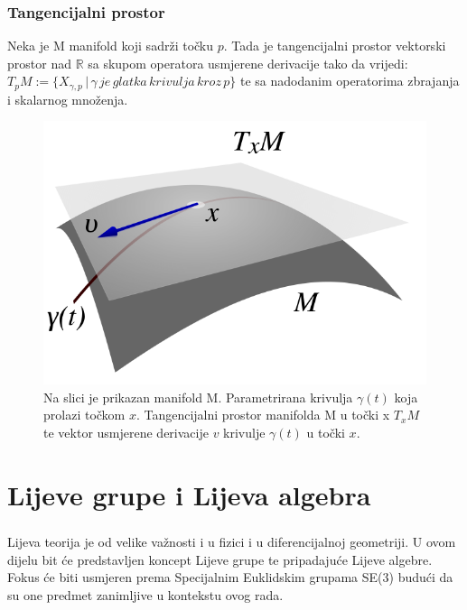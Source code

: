 \documentclass[times, utf8, diplomski]{fer}
\begin{document}
	\subsection{Tangencijalni prostor} Neka je M manifold koji sadrži točku $p$. Tada je tangencijalni prostor vektorski prostor nad $\mathbb{R}$ sa skupom operatora usmjerene derivacije tako da vrijedi: \\
	$T_p M := \{ X_{\gamma, p} \, | \, \gamma \, je \, glatka \, krivulja \, kroz \, p\}$ te sa nadodanim operatorima zbrajanja i skalarnog množenja.
	
	\begin{figure}[h!]
		\includegraphics[width=\textwidth]{figures/txm.png}
		\caption{Na slici je prikazan manifold M. Parametrirana krivulja $\gamma(t)$ koja prolazi točkom $x$. Tangencijalni prostor manifolda M u točki x $T_x M$ te vektor usmjerene derivacije $v$ krivulje $\gamma (t)$ u točki $x$. }
	\end{figure}
	
\chapter{Lijeve grupe i Lijeva algebra}

	\paragraph{}Lijeva teorija je od velike važnosti i u fizici i u diferencijalnoj geometriji. U ovom dijelu bit će predstavljen koncept Lijeve grupe te pripadajuće Lijeve algebre. Fokus će biti usmjeren prema Specijalnim Euklidskim grupama SE(3) budući da su one predmet zanimljive u kontekstu ovog rada.
	
\end{document}
